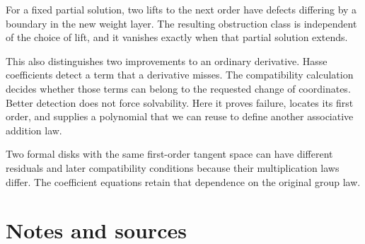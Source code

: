 \documentclass[11pt,letterpaper]{article}
\begin{document}
For a fixed partial solution, two lifts to the next order have defects differing by a boundary in the new weight layer. The resulting obstruction class is independent of the choice of lift, and it vanishes exactly when that partial solution extends.


This also distinguishes two improvements to an ordinary derivative. Hasse coefficients detect a term that a derivative misses. The compatibility calculation decides whether those terms can belong to the requested change of coordinates. Better detection does not force solvability. Here it proves failure, locates its first order, and supplies a polynomial that we can reuse to define another associative addition law.


Two formal disks with the same first-order tangent space can have different residuals and later compatibility conditions because their multiplication laws differ. The coefficient equations retain that dependence on the original group law.



\clearpage\section*{Notes and sources}\hypertarget{notes-and-sources}{}
\end{document}
